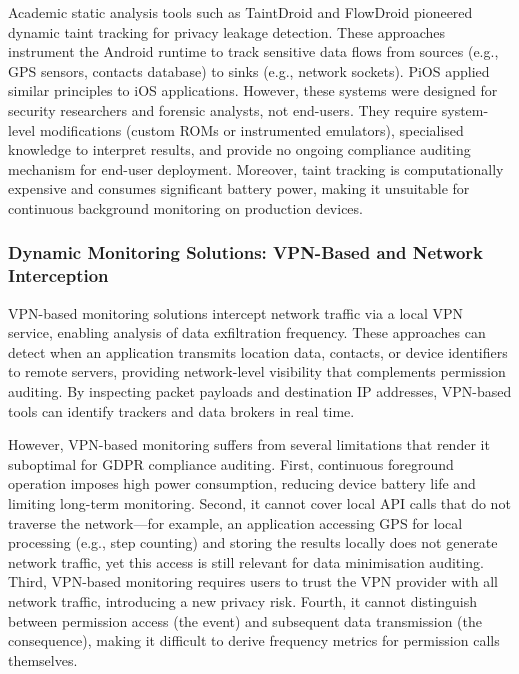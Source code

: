 Academic static analysis tools such as TaintDroid \cite{49} and FlowDroid pioneered dynamic taint tracking for privacy leakage detection. These approaches instrument the Android runtime to track sensitive data flows from sources (e.g., GPS sensors, contacts database) to sinks (e.g., network sockets). PiOS \cite{49} applied similar principles to iOS applications. However, these systems were designed for security researchers and forensic analysts, not end-users. They require system-level modifications (custom ROMs or instrumented emulators), specialised knowledge to interpret results, and provide no ongoing compliance auditing mechanism for end-user deployment. Moreover, taint tracking is computationally expensive and consumes significant battery power, making it unsuitable for continuous background monitoring on production devices.

\subsubsection{Dynamic Monitoring Solutions: VPN-Based and Network Interception}
VPN-based monitoring solutions intercept network traffic via a local VPN service, enabling analysis of data exfiltration frequency. These approaches can detect when an application transmits location data, contacts, or device identifiers to remote servers, providing network-level visibility that complements permission auditing. By inspecting packet payloads and destination IP addresses, VPN-based tools can identify trackers and data brokers in real time.

However, VPN-based monitoring suffers from several limitations that render it suboptimal for GDPR compliance auditing. First, continuous foreground operation imposes high power consumption, reducing device battery life and limiting long-term monitoring. Second, it cannot cover local API calls that do not traverse the network—for example, an application accessing GPS for local processing (e.g., step counting) and storing the results locally does not generate network traffic, yet this access is still relevant for data minimisation auditing. Third, VPN-based monitoring requires users to trust the VPN provider with all network traffic, introducing a new privacy risk. Fourth, it cannot distinguish between permission access (the event) and subsequent data transmission (the consequence), making it difficult to derive frequency metrics for permission calls themselves.

